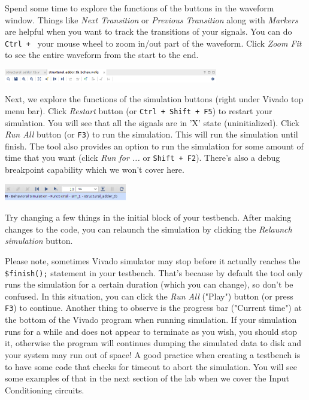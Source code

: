 \documentclass[11pt]{article}
\begin{document}
Spend some time to explore the functions of the buttons in the waveform window. Things like \emph{Next Transition} or \emph{Previous Transition} along with \emph{Markers} are helpful when you want to track the transitions of your signals. You can do \texttt{Ctrl + } your mouse wheel to zoom in/out part of the waveform. Click \emph{Zoom Fit} to see the entire waveform from the start to the end.
 
 \begin{center}
\includegraphics[width=0.7\textwidth]{figs/vivado_sim3.png}
\end{center}

Next, we explore the functions of the simulation buttons (right under Vivado top menu bar). Click \emph{Restart} button (or \texttt{Ctrl + Shift + F5}) to restart your simulation. You will see that all the signals are in 'X' state (uninitialized). Click \emph{Run All} button (or \texttt{F3}) to run the simulation. This will run the simulation until finish. The tool also provides an option to run the simulation for some amount of time that you want (click \emph{Run for ...} or \texttt{Shift + F2}). There's also a debug breakpoint capability which we won't cover here.

\begin{center}
\includegraphics[width=0.4\textwidth]{figs/vivado_sim4.png}
\end{center}

Try changing a few things in the initial block of your testbench. After making changes to the code, you can relaunch the simulation by clicking the \emph{Relaunch simulation} button.

Please note, sometimes Vivado simulator may stop before it actually reaches the \verb|$finish();| statement in your testbench. That's because by default the tool only runs the simulation for a certain duration (which you can change), so don't be confused. In this situation, you can click the \emph{Run All} ("Play") button (or press \texttt{F3}) to continue. Another thing to observe is the progress bar ("Current time") at the bottom of the Vivado program when running simulation. If your simulation runs for a while and does not appear to terminate as you wish, you should stop it, otherwise the program will continues dumping the simulated data to disk and your system may run out of space! A good practice when creating a testbench is to have some code that checks for timeout to abort the simulation. You will see some examples of that in the next section of the lab when we cover the Input Conditioning circuits.
\end{document}
